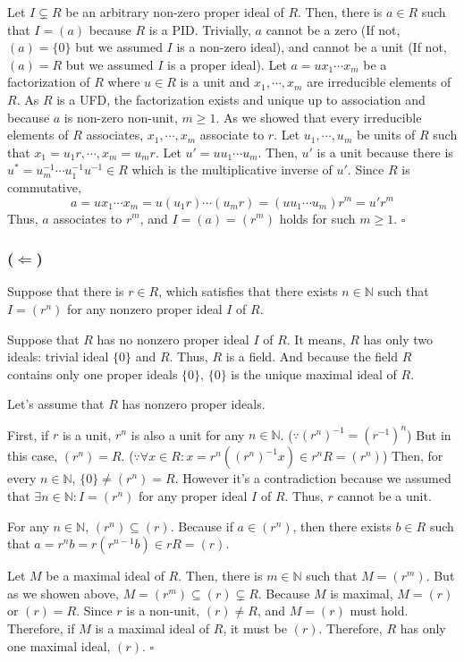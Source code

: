 \documentclass{article}
\newcommand{\qedsq}{\hfill$\square$}
\newcommand{\bbN}{\mathbb{N}}
\begin{document}
Let \(I \subsetneq R\) be an arbitrary non-zero proper ideal of \(R\).
Then, there is \(a \in R\) such that \(I = (a)\) because \(R\) is a PID.
Trivially, \(a\) cannot be a zero (If not, \((a) = \{0\}\) but we assumed \(I\) is a non-zero ideal), and cannot be a unit (If not, \((a) = R\) but we assumed \(I\) is a proper ideal).
Let \(a = u x_1 \cdots x_m\) be a factorization of \(R\)
where \(u \in R\) is a unit
and \(x_1, \cdots, x_m\) are irreducible elements of \(R\).
As \(R\) is a UFD,
the factorization exists and unique up to association
and
because \(a\) is non-zero non-unit, \(m \ge 1\).
As we showed that every irreducible elements of \(R\) associates,
\(x_1, \cdots, x_m\) associate to \(r\).
Let \(u_1, \cdots, u_m\) be units of \(R\) such that \(x_1 = u_1r, \cdots, x_m = u_m r\).
Let \(u' = u u_1 \cdots u_m\).
Then, \(u'\) is a unit because there is \(u^* = u_m^{-1} \cdots u_1^{-1} u^{-1} \in R\) which is the multiplicative inverse of \(u'\).
Since \(R\) is commutative,
\[ a
  = u x_1 \cdots x_m
  = u (u_1 r) \cdots (u_m r)
  = (u u_1 \cdots u_m) r^m
  = u' r^m
\]
Thus, \(a\) associates to \(r^m\),
and \(I = (a) = (r^m)\) holds for such \(m \ge 1\).
\qedsq

\subsubsection*{(\(\Longleftarrow\))}

Suppose that there is \(r \in R\), which satisfies that there exists \(n \in \bbN\) such that \(I = (r^n)\) for any nonzero proper ideal \(I\) of \(R\).
\newline

\noindent
Suppose that \(R\) has no nonzero proper ideal \(I\) of \(R\).
It means, \(R\) has only two ideals: trivial ideal \(\{0\}\) and \(R\).
Thus, \(R\) is a field.
And because the field \(R\) contains only one proper ideals \(\{0\}\), \(\{0\}\) is the unique maximal ideal of \(R\).
\newline

\noindent
Let's assume that \(R\) has nonzero proper ideals.

First, if \(r\) is a unit, \(r^n\) is also a unit for any \(n \in \bbN\).
(\(\because (r^n)^{-1} = (r^{-1})^n\))
But in this case, \((r^n) = R\).
(\(\because \forall x \in R: x = r^n((r^n)^{-1}x) \in r^nR = (r^n)\))
Then, for every \(n \in \bbN\), \(\{0\} \neq (r^n) = R\).
However it's a contradiction because we assumed that \(\exists n \in \bbN: I = (r^n)\) for any proper ideal \(I\) of \(R\). Thus, \(r\) cannot be a unit.

For any \(n \in \bbN\), \((r^n) \subseteq (r)\).
Because if \(a \in (r^n)\),
then there exists \(b \in R\) such that \(a = r^nb = r (r^{n - 1}b) \in rR = (r)\).

Let \(M\) be a maximal ideal of \(R\).
Then, there is \(m \in \bbN\) such that \(M = (r^m)\).
But as we showen above, \(M = (r^m) \subseteq (r) \subsetneq R\).
Because \(M\) is maximal, \(M = (r)\) or \((r) = R\).
Since \(r\) is a non-unit, \((r) \neq R\), and \(M = (r)\) must hold.
Therefore, if \(M\) is a maximal ideal of \(R\), it must be \((r)\).
Therefore, \(R\) has only one maximal ideal, \((r)\).
\qedsq
\end{document}
